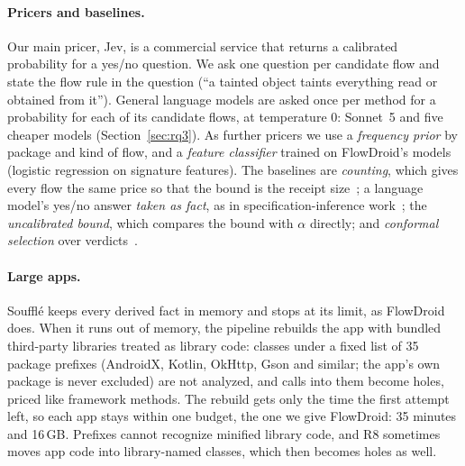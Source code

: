 \paragraph{Pricers and baselines.}
Our main pricer, Jev, is a commercial service that returns a calibrated probability for a yes/no question.
We ask one question per candidate flow and state the flow rule in the question (``a tainted object taints everything read or obtained from it'').
General language models are asked once per method for a probability for each of its candidate flows, at temperature 0: Sonnet~5 and five cheaper models (Section~\ref{sec:rq3}).
As further pricers we use a \emph{frequency prior} by package and kind of flow, and a \emph{feature classifier} trained on FlowDroid's models (logistic regression on signature features).
The baselines are \emph{counting}, which gives every flow the same price so that the bound is the receipt size~\cite{bastani-oopsla15}; a language model's yes/no answer \emph{taken as fact}, as in specification-inference work~\cite{iris,semtaint}; the \emph{uncalibrated bound}, which compares the bound with $\alpha$ directly; and \emph{conformal selection} over verdicts~\cite{conformalselection}.

\paragraph{Large apps.}
Souffl\'e keeps every derived fact in memory and stops at its limit, as FlowDroid does.
When it runs out of memory, the pipeline rebuilds the app with bundled third-party libraries treated as library code: classes under a fixed list of 35 package prefixes (AndroidX, Kotlin, OkHttp, Gson and similar; the app's own package is never excluded) are not analyzed, and calls into them become holes, priced like framework methods.
The rebuild gets only the time the first attempt left, so each app stays within one budget, the one we give FlowDroid: 35 minutes and 16\,GB.
Prefixes cannot recognize minified library code, and R8 sometimes moves app code into library-named classes, which then becomes holes as well.
